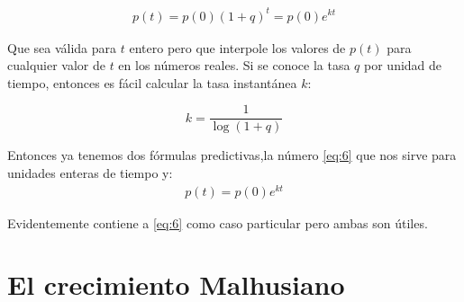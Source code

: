 \begin{align*}
    p(t)=p(0)(1+q)^t=p(0)e^{kt}
\end{align*}

Que sea válida para $t$ entero pero que interpole los valores de $p(t)$ para cualquier valor de $t$ en los números reales. Si se conoce la tasa $q$ por unidad de tiempo, entonces es fácil calcular la tasa instantánea $k$:

\[
k=\dfrac{1}{\log(1+q)}
\]


Entonces ya tenemos dos fórmulas predictivas,la número \ref{eq:6} que nos sirve para unidades enteras de tiempo y:
\begin{align}
   p(t)=p(0)e^{kt}
\end{align}

Evidentemente \label{eq:8} contiene a \ref{eq:6} como caso particular pero ambas son útiles. 





\section{El crecimiento Malhusiano}








